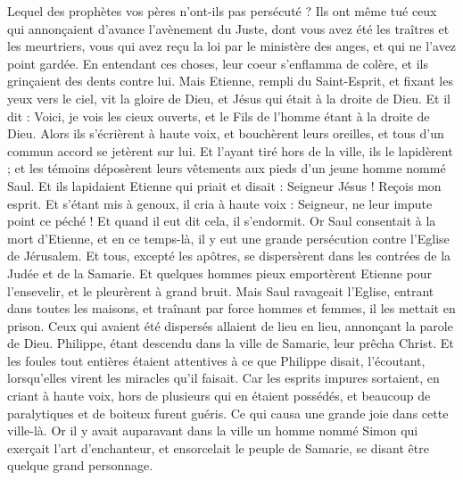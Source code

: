 \begin{multicols}{2}
Lequel des prophètes vos pères n'ont-ils pas persécuté ? Ils ont même tué ceux qui annonçaient d’avance l'avènement du Juste, dont vous avez été les traîtres et les meurtriers,
vous qui avez reçu la loi par le ministère des anges, et qui ne l'avez point gardée.
En entendant ces choses, leur coeur s'enflamma de colère, et ils grinçaient des dents contre lui.
Mais Etienne, rempli du Saint-Esprit, et fixant les yeux vers le ciel, vit la gloire de Dieu, et Jésus qui était à la droite de Dieu.
Et il dit : Voici, je vois les cieux ouverts, et le Fils de l'homme étant à la droite de Dieu.
Alors ils s'écrièrent à haute voix, et bouchèrent leurs oreilles, et tous d'un commun accord se jetèrent sur lui.
Et l'ayant tiré hors de la ville, ils le lapidèrent ; et les témoins déposèrent leurs vêtements aux pieds d'un jeune homme nommé Saul.
Et ils lapidaient Etienne qui priait et disait : Seigneur Jésus ! Reçois mon esprit.
Et s'étant mis à genoux, il cria à haute voix : Seigneur, ne leur impute point ce péché ! Et quand il eut dit cela, il s'endormit.
\VerseOne{}Or Saul consentait à la mort d'Etienne, et en ce temps-là, il y eut une grande persécution contre l'Eglise de Jérusalem. Et tous, excepté les apôtres, se dispersèrent dans les contrées de la Judée et de la Samarie.
Et quelques hommes pieux emportèrent Etienne pour l'ensevelir, et le pleurèrent à grand bruit.
Mais Saul ravageait l'Eglise, entrant dans toutes les maisons, et traînant par force hommes et femmes, il les mettait en prison.
Ceux qui avaient été dispersés allaient de lieu en lieu, annonçant la parole de Dieu.
Philippe, étant descendu dans la ville de Samarie, leur prêcha Christ.
Et les foules tout entières étaient attentives à ce que Philippe disait, l'écoutant, lorsqu’elles virent les miracles qu'il faisait.
Car les esprits impures sortaient, en criant à haute voix, hors de plusieurs qui en étaient possédés, et beaucoup de paralytiques et de boiteux furent guéris.
Ce qui causa une grande joie dans cette ville-là.
Or il y avait auparavant dans la ville un homme nommé Simon qui exerçait l’art d’enchanteur, et ensorcelait le peuple de Samarie, se disant être quelque grand personnage.

\end{multicols}
